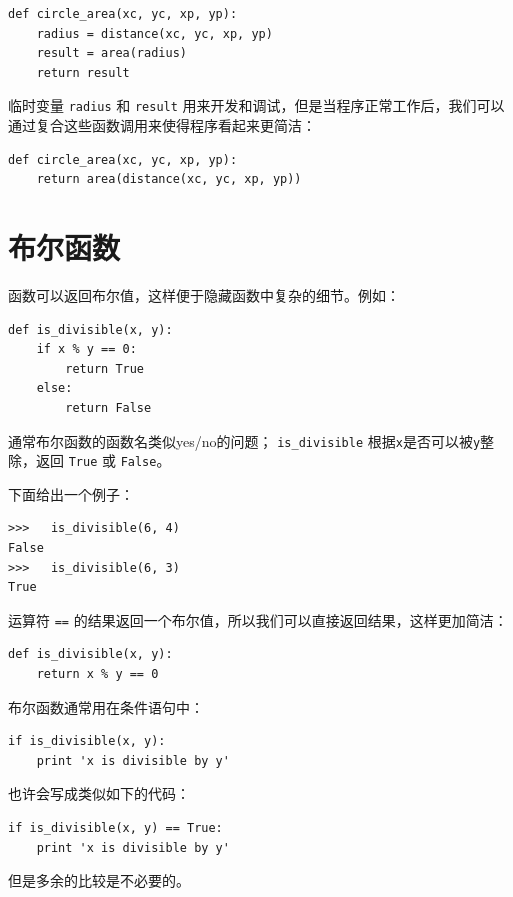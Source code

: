 
\beforeverb
\begin{verbatim}
def circle_area(xc, yc, xp, yp):
    radius = distance(xc, yc, xp, yp)
    result = area(radius)
    return result
\end{verbatim}
\afterverb
%
临时变量 {\tt radius} 和 {\tt result} 用来开发和调试，但是当程序正常工作后，我们可以通过复合这些函数调用来使得程序看起来更简洁：

\beforeverb
\begin{verbatim}
def circle_area(xc, yc, xp, yp):
    return area(distance(xc, yc, xp, yp))
\end{verbatim}
\afterverb
%

\section{布尔函数}
\label{布尔}


函数可以返回布尔值，这样便于隐藏函数中复杂的细节。例如：

\beforeverb
\begin{verbatim}
def is_divisible(x, y):
    if x % y == 0:
        return True
    else:
        return False
\end{verbatim}
\afterverb
%
通常布尔函数的函数名类似yes/no的问题； \verb"is_divisible" 根据{\tt x}是否可以被{\tt y}整除，返回 {\tt True} 或 {\tt False}。

下面给出一个例子：

\beforeverb
\begin{verbatim}
>>>   is_divisible(6, 4)
False
>>>   is_divisible(6, 3)
True
\end{verbatim}
\afterverb
%
运算符 {\tt ==} 的结果返回一个布尔值，所以我们可以直接返回结果，这样更加简洁：

\beforeverb
\begin{verbatim}
def is_divisible(x, y):
    return x % y == 0
\end{verbatim}
\afterverb
%
布尔函数通常用在条件语句中：


\beforeverb
\begin{verbatim}
if is_divisible(x, y):
    print 'x is divisible by y'
\end{verbatim}
\afterverb
%
也许会写成类似如下的代码：

\beforeverb
\begin{verbatim}
if is_divisible(x, y) == True:
    print 'x is divisible by y'
\end{verbatim}
\afterverb
%
但是多余的比较是不必要的。

